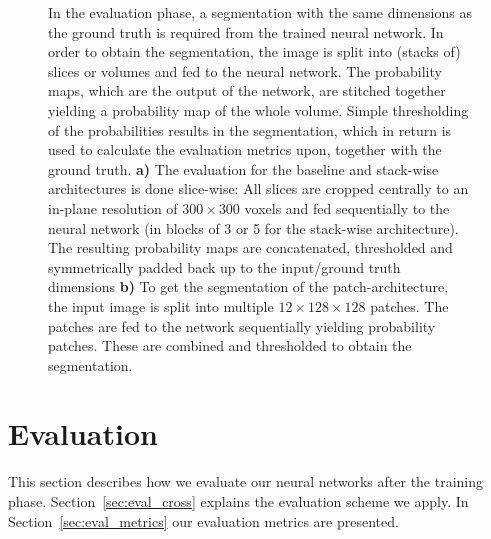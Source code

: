 \begin{figure}[htbp]
	\centering
	\hfill
	\caption[Evaluation Strategy]{In the evaluation phase, a segmentation with the same dimensions as the ground truth is required from the trained neural network. In order to obtain the segmentation, the image is split into (stacks of) slices or volumes and fed to the neural network. The probability maps, which are the output of the network, are stitched together yielding a probability map of the whole volume. Simple thresholding of the probabilities results in the segmentation, which in return is used to calculate the evaluation metrics upon, together with the ground truth. \textbf{a)} The evaluation for the baseline and stack-wise architectures is done slice-wise: All slices are cropped centrally to an in-plane resolution of $300 \times 300$ voxels and fed sequentially to the neural network (in blocks of 3 or 5 for the stack-wise architecture). The resulting probability maps are concatenated, thresholded and symmetrically padded back up to the input/ground truth dimensions \textbf{b)} To get the segmentation of the patch-architecture, the input image is split into multiple $12 \times 128 \times 128$ patches. The patches are fed to the network sequentially yielding probability patches. These are combined and thresholded to obtain the segmentation.}
	\label{fig:eval_strategy}  
\end{figure}

\section{Evaluation} \label{sec:evaluation}
This section describes how we evaluate our neural networks after the training phase. Section~\ref{sec:eval_cross} explains the evaluation scheme we apply. In Section~\ref{sec:eval_metrics} our evaluation metrics are presented.

